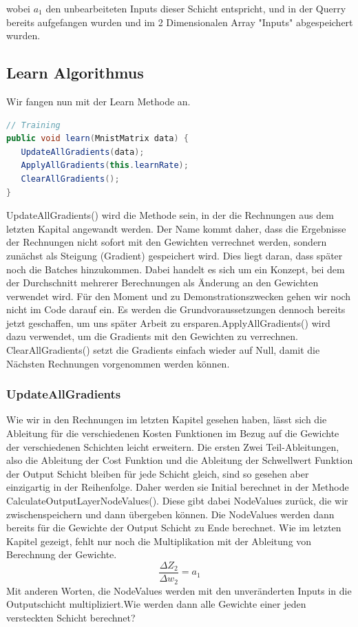 \documentclass[12pt]{article}
\begin{document}
wobei $a_1$ den unbearbeiteten Inputs dieser Schicht entspricht, und in der Querry bereits aufgefangen wurden und im 2 Dimensionalen Array "Inputs" abgespeichert wurden.\subsection{Learn Algorithmus}Wir fangen nun mit der Learn Methode an.\begin{lstlisting}[language=Java]
// Training
public void learn(MnistMatrix data) {
   UpdateAllGradients(data);
   ApplyAllGradients(this.learnRate);
   ClearAllGradients();
}
\end{lstlisting}UpdateAllGradients() wird die Methode sein, in der die Rechnungen aus dem letzten Kapital angewandt werden. Der Name kommt daher, dass die Ergebnisse der Rechnungen nicht sofort mit den Gewichten verrechnet werden, sondern zunächst als Steigung (Gradient) gespeichert wird. Dies liegt daran, dass später noch die Batches hinzukommen. Dabei handelt es sich um ein Konzept, bei dem der Durchschnitt mehrerer Berechnungen  als Änderung an den Gewichten verwendet wird. Für den Moment und zu Demonstrationszwecken gehen wir noch nicht im Code darauf ein. Es werden die Grundvoraussetzungen dennoch bereits jetzt geschaffen, um uns später Arbeit zu ersparen.ApplyAllGradients() wird dazu verwendet, um die Gradients mit den Gewichten zu verrechnen. 
ClearAllGradients() setzt die Gradients einfach wieder auf Null, damit die Nächsten Rechnungen vorgenommen werden können.\subsubsection{UpdateAllGradients}Wie wir in den Rechnungen im letzten Kapitel gesehen haben, lässt sich die Ableitung für die verschiedenen Kosten Funktionen im Bezug auf die Gewichte der verschiedenen Schichten leicht erweitern. Die ersten Zwei Teil-Ableitungen, also die Ableitung der Cost Funktion und die Ableitung der Schwellwert Funktion der Output Schicht bleiben für jede Schicht gleich, sind so gesehen aber einzigartig in der Reihenfolge. Daher werden sie Initial berechnet in der Methode CalculateOutputLayerNodeValues(). Diese gibt dabei NodeValues zurück, die wir zwischenspeichern und dann übergeben können. Die NodeValues werden dann bereits für die Gewichte der Output Schicht zu Ende berechnet. Wie im letzten Kapitel gezeigt, fehlt nur noch die Multiplikation mit der Ableitung von Berechnung der Gewichte. 
$$\frac{\Delta Z_2}{\Delta w_2}=a_1$$
Mit anderen Worten, die NodeValues werden mit den unveränderten Inputs in die Outputschicht multipliziert.Wie werden dann alle Gewichte einer jeden versteckten Schicht berechnet? 
\end{document}
